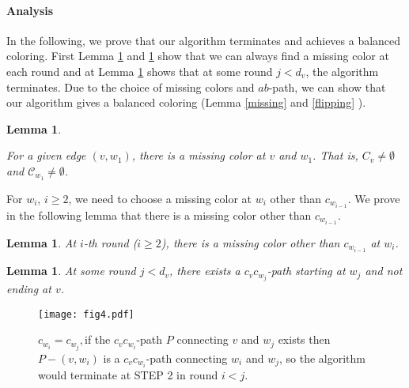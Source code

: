 \documentclass[titlepage, 11pt]{article}
\newtheorem{lemma}[theorem]{Lemma}
\begin{document}
\paragraph{Analysis} In the following, we prove that our algorithm terminates and achieves 
a balanced coloring. First Lemma \ref{saturated} and \ref{lemma:saturated2} show that we can always find a missing color at each round and at Lemma \ref{termin} shows that at some round $j < d_v$,
the algorithm terminates. Due to the choice of missing colors and $ab$-path,
we can show that our algorithm gives a balanced coloring (Lemma \ref{missing} and \ref{flipping} ).

\begin{lemma}\label{saturated}
\iffalse
For vertex $v$ with $|S_v| = k - 1$, if $v$ has a balanced coloring and an uncolored adjacent edge $e$ then there must be a very weak color class in $\mathcal{C}_v$.
For vertex $v$ with $|S_v| = \alpha_v + 1$, has a balanced coloring then there must be a very weak color class at $v$.
\fi
For a given edge $(v, w_1)$, there is a missing color at $v$ and $w_1$.
That is, $C_v \neq \emptyset$ and  $\mathcal{C}_{w_1} \neq \emptyset$.
\end{lemma}

For $w_i$, $i \ge 2$,  we need to choose a missing color at $w_i$ other than $c_{w_{i-1}}$. We prove in the following lemma
that there is a missing color other than $c_{w_{i-1}}$. 
\begin{lemma}\label{lemma:saturated2}
At $i$-th round ($i \ge 2$), there is a missing color other than $c_{w_{i-1}}$ at $w_i$. 
\end{lemma}

\begin{lemma}\label{termin}
At some round $j < d_v$, there exists a $c_vc_{w_j}$-path starting at $w_j$ and not ending at $v$.
\end{lemma}

\begin{figure}[ht]      
\begin{center}        
  \begin{center}
    \centerline{\texttt{[image: fig4.pdf]}}
    \caption{$c_{w_i} = c_{w_j}, $if the $c_vc_{w_i}$-path $P$ connecting $v$ and $w_j$ exists then $P - (v,w_i)$ is a $c_vc_{w_i}$-path connecting $w_i$ and $w_j$, so the algorithm would terminate at STEP 2 in round $i < j$.
\label{fig:lemma12}}
  \end{center}
\end{center}
\end{figure}
\end{document}
